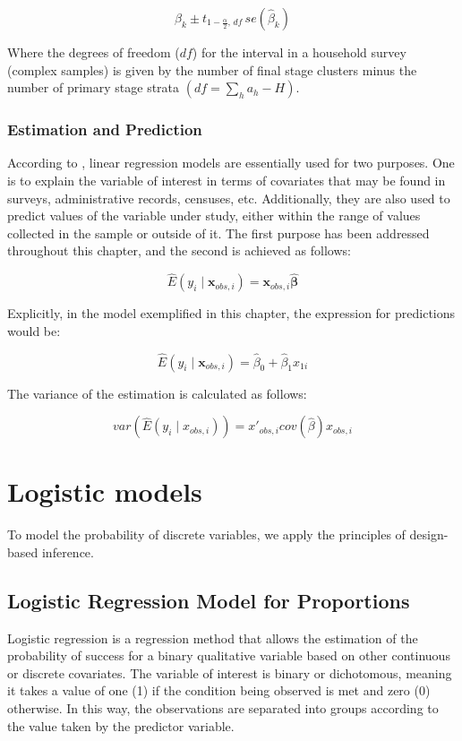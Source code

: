 \documentclass[
  12pt,
]{book}
\begin{document}
\[
\hat{\beta}_{k}\pm t_{1-\frac{\alpha}{2},\,df}\,se\left(\hat{\beta}_{k}\right)
\]

Where the degrees of freedom (\(df\)) for the interval in a household survey (complex samples) is given by the number of final stage clusters minus the number of primary stage strata \(\left(df=\sum_{h}a_{h}-H\right)\).

\subsubsection{Estimation and Prediction}\label{estimation-and-prediction}

According to \citet{neter1996applied}, linear regression models are essentially used for two purposes. One is to explain the variable of interest in terms of covariates that may be found in surveys, administrative records, censuses, etc. Additionally, they are also used to predict values of the variable under study, either within the range of values collected in the sample or outside of it. The first purpose has been addressed throughout this chapter, and the second is achieved as follows:

\[
\hat{E}(y_{i}\mid\boldsymbol{x}_{obs,i})=\boldsymbol{x}_{obs,i}\hat{\boldsymbol{\beta}}
\]

Explicitly, in the model exemplified in this chapter, the expression for predictions would be:

\[
\hat{E}(y_{i}\mid\boldsymbol{x}_{obs,i})=\hat{\beta}_{0}+\hat{\beta}_{1}x_{1i}
\]

The variance of the estimation is calculated as follows:

\[
var\left(\hat{E}\left(y_{i}\mid x_{obs,i}\right)\right) 
=  x'_{obs,i}cov\left(\hat{\beta}\right)x{}_{obs,i}
\]

\section{Logistic models}\label{logistic-models}

To model the probability of discrete variables, we apply the principles of design-based inference.

\subsection{Logistic Regression Model for Proportions}\label{logistic-regression-model-for-proportions}

Logistic regression is a regression method that allows the estimation of the probability of success for a binary qualitative variable based on other continuous or discrete covariates. The variable of interest is binary or dichotomous, meaning it takes a value of one (1) if the condition being observed is met and zero (0) otherwise. In this way, the observations are separated into groups according to the value taken by the predictor variable.
\end{document}
